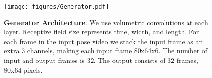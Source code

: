 \begin{figure}
\centering
\texttt{[image: figures/Generator.pdf]} 
\vspace{-0.2in}
\caption{{\bf Generator Architecture}. We use volumetric convolutions at each layer. Receptive field size represents time, width, and length. For each frame in the input pose video we stack the input frame as an extra 3 channels, making each input frame 80x64x6. The number of input and output frames is 32. The output consists of 32 frames, 80x64 pixels.}
\vspace{-0.2in}
\label{fig:GANArchitecture}
\end{figure}
